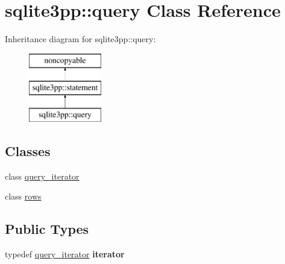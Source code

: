 \hypertarget{classsqlite3pp_1_1query}{\section{sqlite3pp\-:\-:query Class Reference}
\label{classsqlite3pp_1_1query}
}
Inheritance diagram for sqlite3pp\-:\-:query\-:\begin{figure}[H]
\begin{center}
\leavevmode
\includegraphics[height=3.000000cm]{classsqlite3pp_1_1query}
\end{center}
\end{figure}
\subsection*{Classes}
\begin{DoxyCompactItemize}
\item 
class \hyperlink{classsqlite3pp_1_1query_1_1query__iterator}{query\-\_\-iterator}
\item 
class \hyperlink{classsqlite3pp_1_1query_1_1rows}{rows}
\end{DoxyCompactItemize}
\subsection*{Public Types}
\begin{DoxyCompactItemize}
\item 
\hypertarget{classsqlite3pp_1_1query_a8a8af0cf5d5750fe6b3579fcd37d3c43}{typedef \hyperlink{classsqlite3pp_1_1query_1_1query__iterator}{query\-\_\-iterator} {\bfseries iterator}}\label{classsqlite3pp_1_1query_a8a8af0cf5d5750fe6b3579fcd37d3c43}

\end{DoxyCompactItemize}
